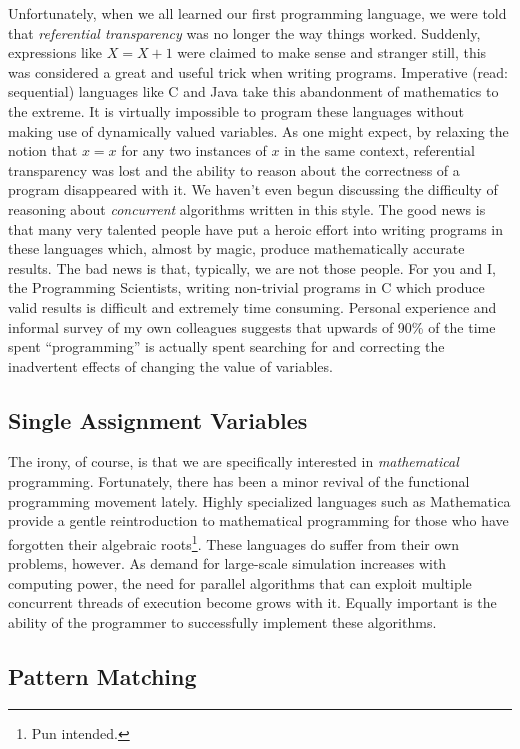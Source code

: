 \documentclass[twocolumn,a4paper,10pt]{article}
\begin{document}
Unfortunately, when we all learned our first programming language, we were told
that \emph{referential transparency} was no longer the way things worked.
Suddenly, expressions like $X = X + 1$ were claimed to make sense and stranger
still, this was considered a great and useful trick when writing programs.
Imperative (read: sequential) languages like C and Java take this abandonment of
mathematics to the extreme. It is virtually impossible to program these
languages without making use of dynamically valued variables. As one might
expect, by relaxing the notion that $x = x$ for any two instances of $x$ in the
same context, referential transparency was lost and the ability to reason about
the correctness of a program disappeared with it. We haven't even begun
discussing the difficulty of reasoning about \emph{concurrent} algorithms
written in this style. The good news is that many very talented people have put
a heroic effort into writing programs in these languages which, almost by magic,
produce mathematically accurate results. The bad news is that, typically, we are
not those people. For you and I, the Programming Scientists, writing non-trivial
programs in C which produce valid results is difficult and extremely time
consuming. Personal experience and informal survey of my own colleagues suggests
that upwards of 90\% of the time spent ``programming'' is actually spent
searching for and correcting the inadvertent effects of changing the value of
variables.

\subsection{Single Assignment Variables}

The irony, of course, is that we are specifically interested in
\emph{mathematical} programming. Fortunately, there has been a minor revival of
the functional programming movement lately. Highly specialized languages such as
Mathematica provide a gentle reintroduction to mathematical programming for
those who have forgotten their algebraic roots\footnote{Pun intended.}. These
languages do suffer from their own problems, however. As demand for large-scale
simulation increases with computing power, the need for parallel algorithms that
can exploit multiple concurrent threads of execution become grows with it.
Equally important is the ability of the programmer to successfully implement
these algorithms.

\subsection{Pattern Matching}
\end{document}

